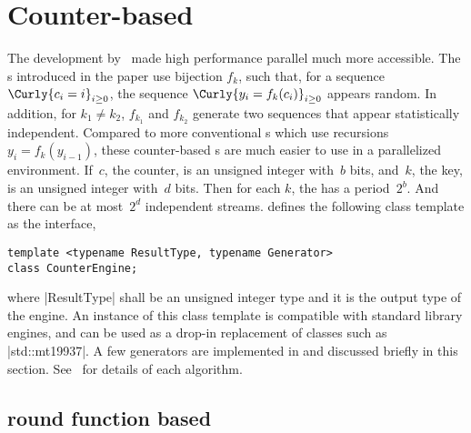 \section{Counter-based \texorpdfstring{\rng}{RNG}}
\label{sec:Counter-based RNG}

The development by~\cite{Salmon:2011um} made high performance parallel \rng
much more accessible. The \rng{}s introduced in the paper use bijection $f_k$,
such that, for a sequence $\Curly{c_i = i}_{i\ge0}$, the sequence $\Curly{y_i =
f_k(c_i)}_{i\ge0}$ appears random. In addition, for $k_1 \ne k_2$, $f_{k_1}$
and $f_{k_2}$ generate two sequences that appear statistically independent.
Compared to more conventional \rng{}s which use recursions $y_i = f_k(y_{i -
1})$, these counter-based \rng{}s are much easier to use in a parallelized
environment. If~$c$, the counter, is an unsigned integer with~$b$ bits,
and~$k$, the key, is an unsigned integer with~$d$ bits. Then for each $k$, the
\rng has a period~$2^b$. And there can be at most~$2^d$ independent streams.
\mckl defines the following class template as the interface,
\begin{verbatim}
template <typename ResultType, typename Generator>
class CounterEngine;
\end{verbatim}
where |ResultType| shall be an unsigned integer type and it is the output type
of the \rng engine. An instance of this class template is compatible with
standard library \rng engines, and can be used as a drop-in replacement of
classes such as |std::mt19937|. A few generators are implemented in \mckl and
discussed briefly in this section. See~\cite{Salmon:2011um} for details of each
algorithm.

\subsection{\texorpdfstring{\aes}{AES} round function based
\texorpdfstring{\rng}{RNG}}
\label{sub:AES round function based RNG}

